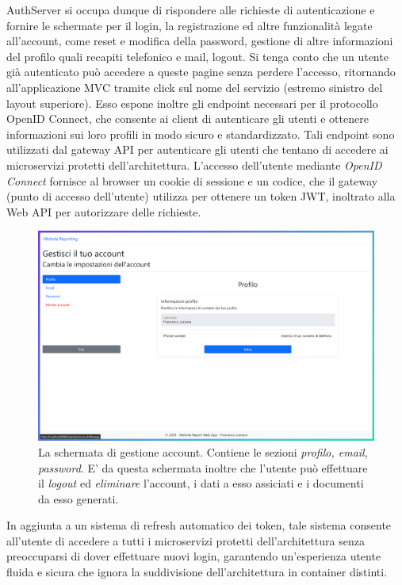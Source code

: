 AuthServer si occupa dunque di rispondere alle richieste di autenticazione e fornire le schermate per il login, la registrazione ed altre funzionalità legate all'account, come reset e modifica della password, gestione di altre informazioni del profilo quali recapiti telefonico e mail, logout. Si tenga conto che un utente già autenticato può accedere a queste pagine senza perdere l'accesso, ritornando all'applicazione MVC tramite click sul nome del servizio (estremo sinistro del layout superiore).
Esso espone inoltre gli endpoint necessari per il protocollo OpenID Connect, che consente ai client di autenticare gli utenti e ottenere informazioni sui loro profili in modo sicuro e standardizzato. Tali endpoint sono utilizzati dal gateway API per autenticare gli utenti che tentano di accedere ai microservizi protetti dell'architettura.
L'accesso dell'utente mediante \emph{OpenID Connect} fornisce al browser un cookie di sessione e un codice, che il gateway (punto di accesso dell'utente) utilizza per ottenere un token JWT, inoltrato alla Web API per autorizzare delle richieste.
\begin{figure}[H]
        \centering
        \includegraphics[width=15.5cm]{fig/screen_manage.png}
        \caption[Schermata gestione utente]{La schermata di gestione account. Contiene le sezioni \emph{profilo, email, password}. E' da questa schermata inoltre che l'utente può effettuare il \emph{logout} ed \emph{eliminare} l'account, i dati a esso assiciati e i documenti da esso generati.}
\end{figure}

In aggiunta a un sistema di refresh automatico dei token, tale sistema consente all'utente di accedere a tutti i microservizi protetti dell'architettura senza preoccuparsi di dover effettuare nuovi login, garantendo un'esperienza utente fluida e sicura che ignora la suddivisione dell'architettura in container distinti.


